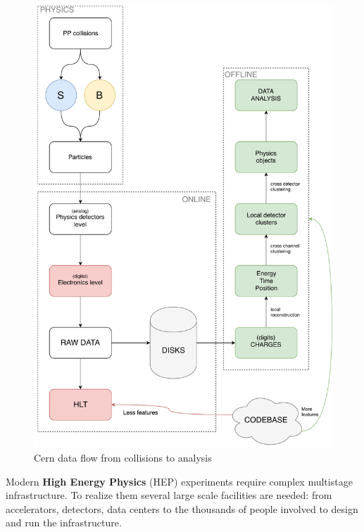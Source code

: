 \begin{figure}[ht]
  \includegraphics[height=\textheight]{img/dataflow}
  \caption{Cern data flow from collisions to analysis}
  \label{img:dataflow}
\end{figure}

Modern \textbf{High Energy Physics} (HEP) experiments require complex multistage infrastructure. To realize them several large scale facilities are needed: from accelerators, detectors, data centers to the thousands of people involved to design and run the infrastructure.\\

